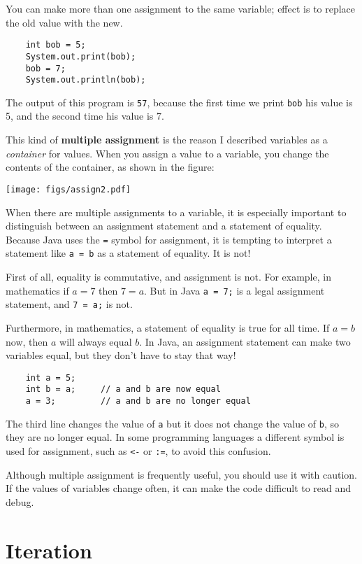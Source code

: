 \documentclass[12pt]{book}
\theoremstyle{definition}
\begin{document}
You can make more than one assignment to the same variable;
effect is to replace the old value
with the new.

\begin{lstlisting}
    int bob = 5;
    System.out.print(bob);
    bob = 7;
    System.out.println(bob);
\end{lstlisting}
%
The output of this program is {\tt 57}, because the first
time we print {\tt bob} his value is 5, and the second time
his value is 7.

This kind of {\bf multiple assignment} is the reason I
described variables as a {\em container} for values.  When
you assign a value to a variable, you change the contents of
the container, as shown in the figure:


\texttt{[image: figs/assign2.pdf]}


When there are multiple assignments to a variable, it is especially
important to distinguish between an assignment statement and a
statement of equality.  Because Java uses the {\tt =} symbol for
assignment, it is tempting to interpret a statement like {\tt a = b}
as a statement of equality.  It is not!

First of all, equality is commutative, and assignment is not.
For example, in mathematics if $a = 7$ then $7 = a$.  But in
Java {\tt a = 7;} is a legal assignment statement, and {\tt 7 = a;}
is not.

Furthermore, in mathematics, a statement of equality is true
for all time.  If $a = b$ now, then $a$ will always equal $b$.
In Java, an assignment statement can make two variables equal,
but they don't have to stay that way!

\begin{lstlisting}
    int a = 5;
    int b = a;     // a and b are now equal
    a = 3;         // a and b are no longer equal
\end{lstlisting}
%
The third line changes the value of {\tt a} but it does not
change the value of {\tt b}, so they are no longer equal.
In some programming languages a different symbol is used
for assignment, such as {\tt <-} or {\tt :=}, to
avoid this confusion.

Although multiple assignment is frequently useful, you should use it
with caution.  If the values of variables change often, it can make
the code difficult to read and debug.


\section{Iteration}
\end{document}
